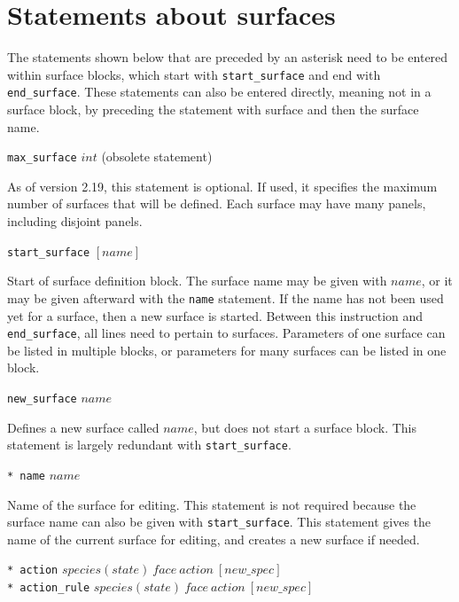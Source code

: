 \documentclass {book}
\newcommand {\ttt} {\texttt}
\begin{document}
\section{Statements about surfaces}

The statements shown below that are preceded by an asterisk need to be entered within surface blocks, which start with \ttt{start\_surface} and end with \ttt{end\_surface}. These statements can also be entered directly, meaning not in a surface block, by preceding the statement with surface and then the surface name.

\begin{description}

\item{\ttt{max\_surface} $int$ (obsolete statement)}

As of version 2.19, this statement is optional. If used, it specifies the maximum number of surfaces that will be defined. Each surface may have many panels, including disjoint panels.

\item{\ttt{start\_surface} $[name]$}

Start of surface definition block. The surface name may be given with $name$, or it may be given afterward with the \ttt{name} statement. If the name has not been used yet for a surface, then a new surface is started. Between this instruction and \ttt{end\_surface}, all lines need to pertain to surfaces. Parameters of one surface can be listed in multiple blocks, or parameters for many surfaces can be listed in one block.

\item{\ttt{new\_surface} $name$}

Defines a new surface called $name$, but does not start a surface block. This statement is largely redundant with \ttt{start\_surface}.

\item{\ttt{* name} $name$}

Name of the surface for editing. This statement is not required because the surface name can also be given with \ttt{start\_surface}. This statement gives the name of the current surface for editing, and creates a new surface if needed.

\item{\ttt{* action} $species(state)\ face\ action\ [new\_spec]$\\
\ttt{* action\_rule} $species(state)\ face\ action\ [new\_spec]$}


\end{description}
\end{document}
